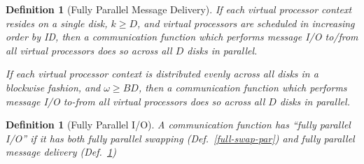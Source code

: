 \documentclass[12pt]{carletoncsthesis}
\newtheorem{definition}[thm]{Definition}
\begin{document}
\begin{definition}[Fully Parallel Message Delivery]
If each virtual processor context resides on a single disk, $k \ge D$,
and virtual processors are scheduled in increasing order by ID, then a
communication function which performs message I/O to/from all virtual
processors does so across all $D$ disks in parallel.

If each virtual processor context is distributed evenly across all disks in
a blockwise fashion, and $\omega \ge BD$, then a communication function which
performs message I/O to-from all virtual processors does so across all $D$
disks in parallel.
\label{full-delivery-par}
\end{definition}

\begin{definition}[Fully Parallel I/O]
A communication function has ``fully parallel I/O'' if it has both
fully parallel swapping (Def.~\ref{full-swap-par}) and fully parallel
message delivery (Def.~\ref{full-delivery-par})
\label{full-disk-par}
\end{definition}
\end{document}
